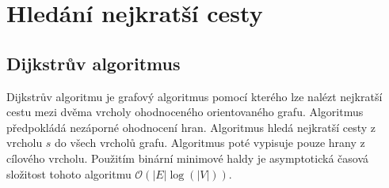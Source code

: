 %
%

\chapter{Hledání nejkratší cesty}

\section{Dijkstrův algoritmus}

Dijkstrův algoritmu je grafový algoritmus pomocí kterého lze nalézt nejkratší cestu mezi dvěma vrcholy ohodnoceného orientovaného grafu. Algoritmus předpokládá nezáporné ohodnocení hran. Algoritmus hledá nejkratší cesty z vrcholu $s$ do všech vrcholů grafu. Algoritmus poté vypisuje pouze hrany z cílového vrcholu. Použitím binární minimové haldy je asymptotická časová složitost tohoto algoritmu $\mathcal{O}(|E|\log(|V|))$. \cite{IntroductionToAlgorithms2022}

